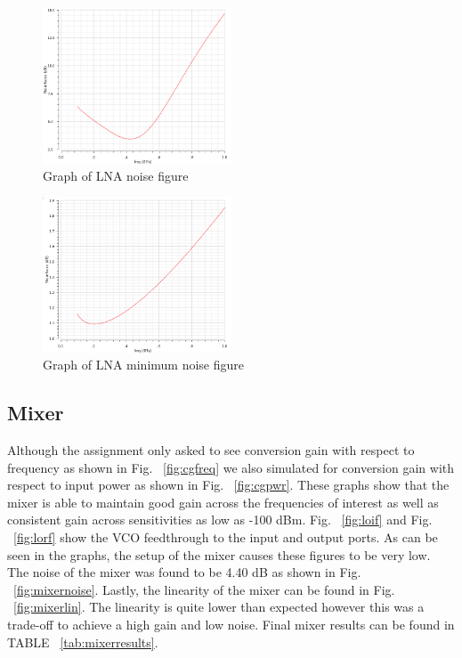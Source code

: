 \begin{figure}[H]
   \centering
    \includegraphics[width=0.5\textwidth]{figures/lnanoise.png}
    \caption{Graph of LNA noise figure}
    \label{fig:lnanoise}
\end{figure}

\begin{figure}[H]
   \centering
    \includegraphics[width=0.5\textwidth]{figures/lnanoisemin.png}
    \caption{Graph of LNA minimum noise figure}
    \label{fig:lnanoisemin}
\end{figure}

\subsection{Mixer}
Although the assignment only asked to see conversion gain with respect to frequency as shown in Fig. ~\ref{fig:cgfreq} we also simulated for conversion gain with respect to input power as shown in Fig. ~\ref{fig:cgpwr}. These graphs show that the mixer is able to maintain good gain across the frequencies of interest as well as consistent gain across sensitivities as low as -100 dBm. Fig. ~\ref{fig:loif} and Fig. ~\ref{fig:lorf} show the VCO feedthrough to the input and output ports. As can be seen in the graphs, the setup of the mixer causes these figures to be very low. The noise of the mixer was found to be 4.40 dB as shown in Fig. ~\ref{fig:mixernoise}. Lastly, the linearity of the mixer can be found in Fig. ~\ref{fig:mixerlin}. The linearity is quite lower than expected however this was a trade-off to achieve a high gain and low noise. Final mixer results can be found in TABLE ~\ref{tab:mixerresults}.

